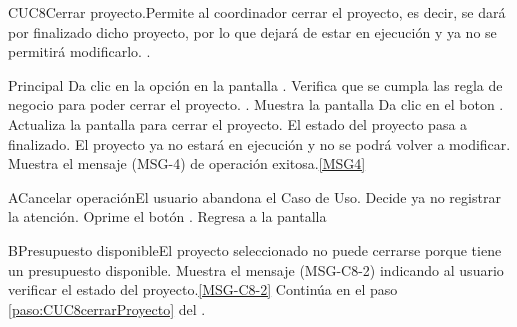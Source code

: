 % 

	\begin{UseCase}{CUC8}{Cerrar proyecto.}{Permite al coordinador cerrar el proyecto, es decir, se dará por finalizado dicho proyecto, por lo que dejará de estar en ejecución y ya no se permitirá modificarlo.}
		.
	\end{UseCase}
		
	\begin{UCtrayectoria}{Principal}
		\UCpaso[\UCactor] Da clic en la opción  en la pantalla .
		\UCpaso Verifica que se cumpla las regla de negocio para poder cerrar el proyecto. . 
		\UCpaso Muestra la pantalla \label{paso:CUC8cerrarProyecto}
		\UCpaso [\UCactor] Da clic en el boton .
		\UCpaso Actualiza la pantalla para cerrar el proyecto.
		\UCpaso El estado del proyecto pasa a finalizado. El proyecto ya no estará en ejecución y no se podrá volver a modificar.
		\UCpaso Muestra el mensaje (MSG-4) de operación exitosa.\ref{MSG4}
	\end{UCtrayectoria}
		
	\begin{UCtrayectoriaA}{A}{Cancelar operación}{El usuario abandona el Caso de Uso.}
			\UCpaso[\UCactor] Decide ya no registrar la atención.
			\UCpaso[\UCactor] Oprime el botón .
			\UCpaso Regresa a la pantalla 
	\end{UCtrayectoriaA}

	\begin{UCtrayectoriaA}{B}{Presupuesto disponible}{El proyecto seleccionado no puede cerrarse porque tiene un presupuesto disponible.}
			\UCpaso Muestra el mensaje (MSG-C8-2) indicando al usuario verificar el estado del proyecto.\ref{MSG-C8-2}
			\UCpaso Continúa en el paso \ref{paso:CUC8cerrarProyecto} del .
	\end{UCtrayectoriaA}